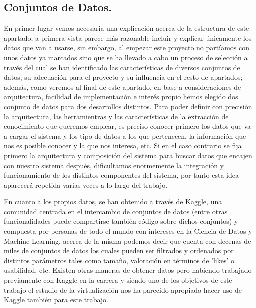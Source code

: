 \documentclass[11pt, a4paper]{article} %
\begin{document}
\subsection{Conjuntos de Datos.}
En primer lugar vemos necesaria una explicación acerca de la estructura de este apartado, a primera vista parece más razonable incluir y explicar únicamente los datos que van a usarse, sin embargo, al empezar este proyecto no partíamos con unos datos ya marcados sino que se ha llevado a cabo un proceso de selección a través del cual se han identificado las características de diversos conjuntos de datos, su adecuación para el proyecto y su influencia en el resto de apartados; además, como veremos al final de este apartado, en base a consideraciones de arquitectura, facilidad de implementación e interés propio hemos elegido dos conjunto de datos para dos desarrollos distintos. Para poder definir con precisión la arquitectura, las herramientras y las características de la extracción de conocimiento que queremos emplear, es preciso conocer primero los datos que va a cargar el sistema y los tipo de datos a los que pertenecen, la información que nos es posible conocer y la que nos interesa, etc. Si en el caso contrario se fija primero la arquitectura y composición del sistema para buscar datos que encajen con nuestro sistema después, dificultamos enormemente la integración y funcionamiento de los distintos componentes del sistema, por tanto esta idea aparecerá repetida varias veces a lo largo del trabajo.


En cuanto a los propios datos, se han obtenido a través de Kaggle, una comunidad centrada en el intercambio de conjuntos de datos (entre otras funcionalidades puede compartirse también código sobre dichos conjuntos) y compuesta por personas de todo el mundo con intereses en la Ciencia de Datos y Machine Learning, acerca de la misma podemos decir que cuenta con decenas de miles de conjuntos de datos los cuales pueden ser filtrados y ordenados por distintos parámetros tales como tamaño, valoración en términos de 'likes' o usabilidad, etc. Existen otras maneras de obtener datos pero habiendo trabajado previamente con Kaggle en la carrera y siendo uno de los objetivos de este trabajo el estudio de la virtualización nos ha parecido apropiado hacer uso de Kaggle también para este trabajo.
\end{document}
